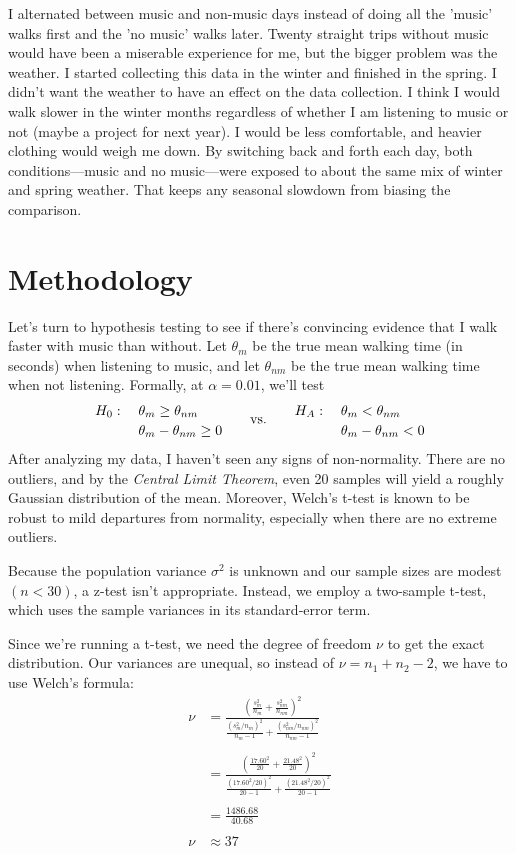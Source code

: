 \documentclass[11pt]{article}
\begin{document}
I alternated between music and non-music days instead of doing all the 'music' walks first and the 'no music' walks later. Twenty straight trips without music would have been a miserable experience for me, but the bigger problem was the weather. I started collecting this data in the winter and finished in the spring. I didn't want the weather to have an effect on the data collection. I think I would walk slower in the winter months regardless of whether I am listening to music or not (maybe a project for next year). I would be less comfortable, and heavier clothing would weigh me down. By switching back and forth each day, both conditions—music and no music—were exposed to about the same mix of winter and spring weather. That keeps any seasonal slowdown from biasing the comparison.

\section{Methodology}
Let's turn to hypothesis testing to see if there’s convincing evidence that I walk faster with music than without. Let $\theta_m$ be the true mean walking time (in seconds) when listening to music, and let $\theta_{nm}$ be the true mean walking time when not listening. Formally, at $\alpha = 0.01$, we'll test
\[
\begin{array}{rlcrl}
H_0:\; & \theta_m \ge \theta_{nm}
        & \multirow{2}{*}{\quad\text{vs.}\quad}
        & H_A:\; & \theta_m < \theta_{nm} \\[0.5ex]
       & \theta_m - \theta_{nm} \ge 0 
        & 
        &        & \theta_m - \theta_{nm} < 0
\end{array}
\]
After analyzing my data, I haven't seen any signs of non-normality. There are no outliers, and by the \textit{Central Limit Theorem}, even 20 samples will yield a roughly Gaussian distribution of the mean. Moreover, Welch’s t-test is known to be robust to mild departures from normality, especially when there are no extreme outliers.

Because the population variance $\sigma^2$ is unknown and our sample sizes are modest $(n<30)$, a z-test isn’t appropriate. Instead, we employ a two-sample t-test, which uses the sample variances in its standard‐error term. 


Since we're running a t-test, we need the degree of freedom $\nu$ to get the exact distribution. Our variances are unequal, so instead of $\nu = n_1 +n_2 -2$, we have to use Welch's formula: 
\begin{equation*}
\begin{split}
    \nu & = \frac{(\frac{s_m^2}{n_m}+\frac{s_{nm}^2}{n_{nm}})^2}{\frac{(s_m^2/n_m)^2}{n_m - 1}+\frac{(s_{nm}^2/n_{nm})^2}{n_{nm}-1}} \\ \\
    & = \frac{(\frac{17.60^2}{20}+ \frac{21.48^2}{20})^2}{\frac{(17.60^2 / 20)^2}{20-1}+\frac{(21.48^2 / 20)^2}{20-1}} \\ \\
    & = \frac{1486.68}{40.68} \\ \\
   \nu &  \approx 37
\end{split}
\end{equation*}
\end{document}
